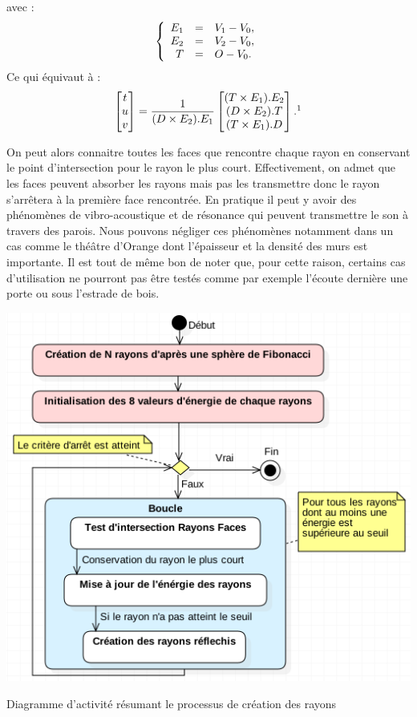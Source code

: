 %
avec : 
\begin{equation}
   \left \{
   \begin{array}{r c l}
E_1 &=&  V_1-V_0,  \\
E_2 &=&  V_2-V_0,  \\
T &=& O - V_0.
   \end{array}
   \right .
\end{equation}
%
Ce qui équivaut à : 
%
\begin{equation}
	\begin{bmatrix}
 	 t \\
	 u \\
	 v
	\end{bmatrix}
	=
	\frac{1}{
 	  (D \times E_2).E_1
	}
	\begin{bmatrix}
 		  (T \times E_1).E_2
 \\ 
 		  (D \times E_2).T
 \\
 		  (T \times E_1).D
	\end{bmatrix}	.
	\footnotemark
\end{equation}

On peut alors connaitre toutes les faces que rencontre chaque rayon en conservant le point d'intersection pour le rayon le plus court. Effectivement, on admet que les faces peuvent absorber les rayons mais pas les transmettre donc le rayon s'arrêtera à la première face rencontrée. En pratique il peut y avoir des phénomènes de vibro-acoustique et de résonance qui peuvent transmettre le son à travers des parois. Nous pouvons négliger ces phénomènes notamment dans un cas comme le théâtre d'Orange dont l'épaisseur et la densité des murs est importante. Il est tout de même bon de noter que, pour cette raison, certains cas d'utilisation ne pourront pas être testés comme par exemple l'écoute dernière une porte ou sous l'estrade de bois.

\begin{figureth}
	\includegraphics[width=0.7\linewidth]{images/DiagRay}
	\caption{Diagramme d'activité résumant le processus de création des rayons}
	\label{DiagRay}
\end{figureth}

